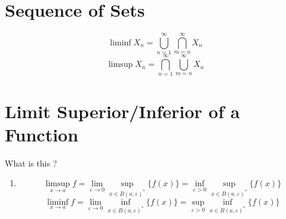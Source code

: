 \section{Sequence of Sets}
\begin{definition}
	\[ \liminf X_n = \bigcup_{n = 1}^\infty \bigcap_{m = n}^\infty X_n \]
	\[ \limsup X_n = \bigcap_{n = 1}^\infty \bigcup_{m = n}^\infty X_n \]
\end{definition}

\section{Limit Superior/Inferior of a Function} What is this ?
\begin{enumerate}
	\item \[ \limsup_{x \to a} f = \lim_{\varepsilon \to 0} \sup_{x \in B(a,\varepsilon)^\ast} \{ f(x) \} = \inf_{\varepsilon > 0} \sup_{x \in B(a,\varepsilon)^\ast} \{ f(x) \} \]
	\[ \liminf_{x \to a} f = \lim_{\varepsilon \to 0} \inf_{x \in B(a,\varepsilon)^\ast} \{ f(x) \} = \sup_{\varepsilon > 0} \inf_{x \in B(a,\varepsilon)^\ast} \{ f(x) \} \]
\end{enumerate}
